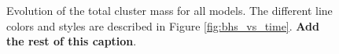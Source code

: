 \documentclass[12pt,preprint]{aastex}
\begin{document}
\begin{figure}[!h]
	\caption{Evolution of the total cluster mass for all models. The different line colors and styles are 
	described in Figure \ref{fig:bhs_vs_time}. \textbf{Add the rest of this caption}. 
	}
	
	
	\label{fig:mass_evolution}
\end{figure}




\end{document}
